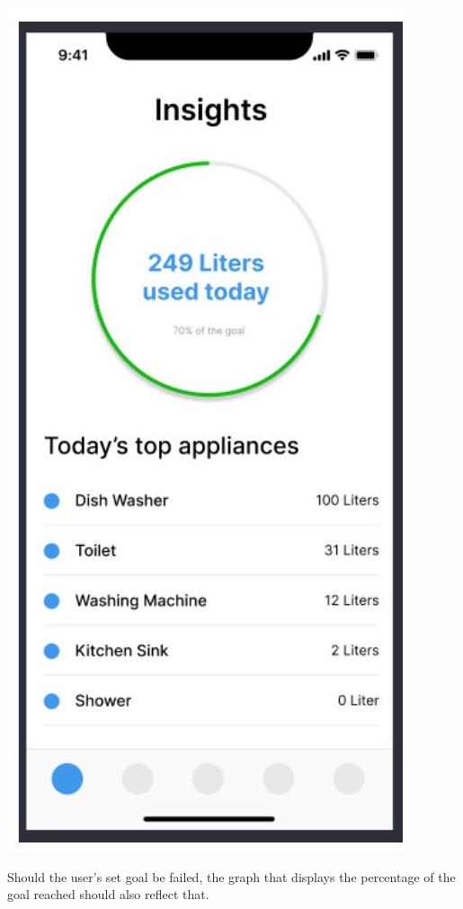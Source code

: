 \documentclass[10pt]{article}
\begin{document}
\includegraphics[max width=\textwidth]{2022_11_16_e80008f3d60227bff292g-6}

Should the user's set goal be failed, the graph that displays the percentage of the goal reached should also reflect that.
\end{document}
